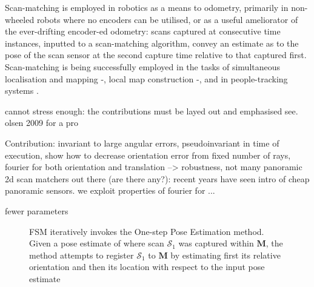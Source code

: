 Scan-matching is employed in robotics as a means to odometry,
primarily in non-wheeled robots where no encoders can be utilised, or as a
useful ameliorator of the ever-drifting encoder-ed odometry: scans captured at
consecutive time instances, inputted to a scan-matching algorithm, convey an
estimate as to the pose of the scan sensor at the second capture time
relative to that captured first. Scan-matching is being successfully employed
in the tasks of simultaneous localisation and mapping
\cite{am_odom_1}-\cite{am_odom_3}, local map construction
\cite{am_odom_4}-\cite{am_odom_6}, and in people-tracking systems
\cite{am_odom_7}.

cannot stress enough: the contributions must be layed out and emphasised
see. olsen 2009 for a pro

Contribution: invariant to large angular errors, pseudoinvariant in time of execution, show how to decrease orientation error from fixed number of rays, fourier for both orientation and translation --> robustness,
not many panoramic 2d scan matchers out there (are there any?): recent years have seen intro of
cheap panoramic sensors. we exploit properties of fourier for ...

fewer parameters




\begin{figure}[]\centering
  
  \caption{\small}
  \label{fig:}
\end{figure}

\begin{figure}[]\centering
  
  \caption{\small FSM iteratively invokes the One-step Pose Estimation method.
           Given a pose estimate of where scan $\mathcal{S}_1$ was captured
           within $\bm{M}$, the method attempts to register $\mathcal{S}_1$ to
           $\bm{M}$ by estimating first its relative orientation and then its
           location with respect to the input pose estimate}
  \label{fig:fsm_inner}
\end{figure}
